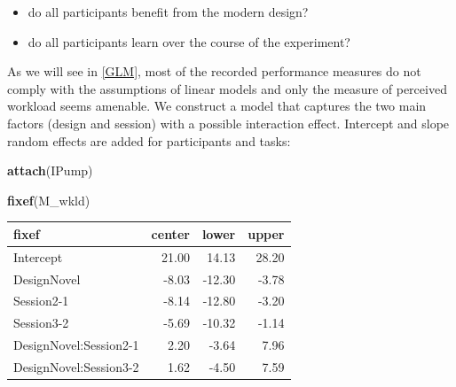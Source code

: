 \documentclass[]{svmono}
\newenvironment{Shaded}{\begin{snugshade}}{\end{snugshade}}
\newcommand{\KeywordTok}[1]{\textcolor[rgb]{0.13,0.29,0.53}{\textbf{#1}}}
\newcommand{\DataTypeTok}[1]{\textcolor[rgb]{0.13,0.29,0.53}{#1}}
\newcommand{\StringTok}[1]{\textcolor[rgb]{0.31,0.60,0.02}{#1}}
\newcommand{\OperatorTok}[1]{\textcolor[rgb]{0.81,0.36,0.00}{\textbf{#1}}}
\newcommand{\NormalTok}[1]{#1}
\providecommand{\tightlist}{%
  \setlength{\itemsep}{0pt}\setlength{\parskip}{0pt}}
\theoremstyle{definition}
\theoremstyle{definition}
\theoremstyle{definition}
\theoremstyle{remark}
\begin{document}
\begin{itemize}
\tightlist
\item
  do all participants benefit from the modern design?
\item
  do all participants learn over the course of the experiment?
\end{itemize}

As we will see in \ref{GLM}, most of the recorded performance measures
do not comply with the assumptions of linear models and only the measure
of perceived workload seems amenable. We construct a model that captures
the two main factors (design and session) with a possible interaction
effect. Intercept and slope random effects are added for participants
and tasks:

\begin{Shaded}
\begin{Highlighting}[]
\KeywordTok{attach}\NormalTok{(IPump)}
\end{Highlighting}
\end{Shaded}

\begin{Shaded}
\end{Shaded}

\begin{Shaded}
\begin{Highlighting}[]
\KeywordTok{fixef}\NormalTok{(M_wkld)}
\end{Highlighting}
\end{Shaded}

\begin{longtable}[]{@{}lrrr@{}}
\toprule
fixef & center & lower & upper\tabularnewline
\midrule
\endhead
Intercept & 21.00 & 14.13 & 28.20\tabularnewline
DesignNovel & -8.03 & -12.30 & -3.78\tabularnewline
Session2-1 & -8.14 & -12.80 & -3.20\tabularnewline
Session3-2 & -5.69 & -10.32 & -1.14\tabularnewline
DesignNovel:Session2-1 & 2.20 & -3.64 & 7.96\tabularnewline
DesignNovel:Session3-2 & 1.62 & -4.50 & 7.59\tabularnewline
\bottomrule
\end{longtable}
\end{document}
